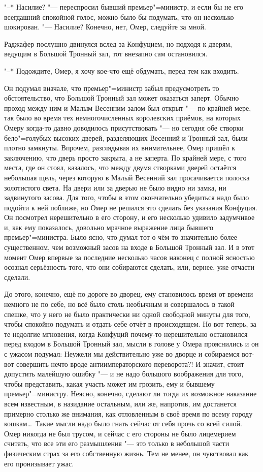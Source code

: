 "--* Насилие? "--- переспросил бывший премьер"=министр, и если бы не его
всегдашний спокойной голос, можно было бы подумать, что он несколько шокирован.
"--- Насилие?
Конечно, нет, Омер, следуйте за мной.

Раджафер послушно двинулся вслед за Конфуцием, но подходя к дверям, ведущим в
Большой Тронный зал, тот внезапно сам остановился.

"--* Подождите, Омер, я хочу кое-что ещё обдумать, перед тем как входить.

Он подумал вначале, что премьер"=министр забыл предусмотреть то обстоятельство,
что Большой Тронный зал может оказаться заперт.
Обычно проход между ним и Малым Весенним залом был открыт "--- по крайней
мере, так было во время тех немногочисленных королевских приёмов, на которых
Омеру когда-то давно доводилось присутствовать "--- но сегодня обе створки
бело"=голубых высоких дверей, разделяющих Весенний и Тронный зал, были плотно
замкнуты.
Впрочем, разглядывая их внимательнее, Омер пришёл к заключению, что дверь просто
закрыта, а не заперта.
По крайней мере, с того места, где он стоял, казалось, что между двумя створками
дверей остаётся небольшая щель, через которую в Малый Весенний зал просачивается
полоска золотистого света.
На двери или за дверью не было видно ни замка, ни задвинутого засова.
Для того, чтобы в этом окончательно убедиться надо было подойти к ней поближе,
но Омер не решался это сделать без указания Конфуция.
Он посмотрел нерешительно в его сторону, и его несколько удивило задумчивое и,
как ему показалось, довольно мрачное выражение лица бывшего премьер"=министра.
Было ясно, что думал тот о чём-то значительно более существенном, чем возможный
засов на входе в Большой Тронный зал.
И в этот момент Омер впервые за последние несколько часов наконец с полной
ясностью осознал серьёзность того, что они собираются сделать, или, вернее, уже
отчасти сделали.

До этого, конечно, ещё по дороге во дворец, ему становилось время от времени
немного не по себе, но всё было столь необычным и совершалось в такой спешке,
что у него не было практически ни одной свободной минуты для того, чтобы
спокойно подумать и отдать себе отчёт в происходящем.
Но вот теперь, за те недолгие мгновения, когда Конфуций почему-то нерешительно
остановился перед входом в Большой Тронный зал, мысли в голове у Омера
прояснились и он с ужасом подумал:
Неужели мы действительно уже во дворце и собираемся вот-вот совершить нечто
вроде антиимператорского переворота?!
И значит, стоит допустить малейшую ошибку "--- и не надо большого воображения
для того, чтобы представить, какая участь может им грозить, ему и бывшему
премьер"=министру.
Неясно, конечно, сделают ли тогда их возможное наказание всем известным, в
назидание остальным, или же, напротив, им достанется примерно столько же
внимания, как отловленным в своё время по всему городу кошкам\ldots\
Такие мысли надо было гнать сейчас от себя прочь со всей силой.
Омер никогда не был трусом, и сейчас с его стороны не было лицемерием считать,
что все эти его размышления "--- это только в небольшой части физическим страх
за его собственную жизнь.
Тем не менее, он чувствовал как его пронизывает ужас.

